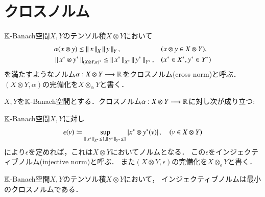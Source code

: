 \section{クロスノルム}
	\begin{screen}
		\begin{dfn}[クロスノルム]
			$\mathbb{K}$-Banach空間$X,Y$のテンソル積$X \otimes Y$において
			\begin{align}
				&\alpha(x \otimes y) \leq \left\|\, x\, \right\|_{X} \left\|\, y\, \right\|_{Y}, && (x \otimes y \in X \otimes Y), \\
				&\left\|\, x^* \otimes y^*\, \right\|_{(X \otimes Y, \alpha)^*} \leq \left\|\, x^*\, \right\|_{X^*} \left\|\, y^*\, \right\|_{Y^*},
				&& (x^* \in X^*, y^* \in Y^*)
			\end{align}
			を満たすようなノルム$\alpha:X \otimes Y \longrightarrow \mathbb{R}$をクロスノルム(cross norm)と呼ぶ．
			$(X \otimes Y, \alpha)$の完備化を$X \otimes_{\alpha} Y$と書く．
		\end{dfn}
	\end{screen}
	
	\begin{screen}
		\begin{thm}
			$X,Y$を$\mathbb{K}$-Banach空間とする．クロスノルム$\alpha:X \otimes Y \longrightarrow \mathbb{R}$に対し次が成り立つ:
		\end{thm}
	\end{screen}
	
	\begin{screen}
		\begin{dfn}[インジェクティブノルム]
			$\mathbb{K}$-Banach空間$X,Y$に対し
			\begin{align}
				\epsilon(v) \coloneqq
				\operatorname*{sup}_{\left\|\, x^*\, \right\|_{X^*}\leq 1,\left\|\, y^*\, \right\|_{Y^*} \leq 1} \left| x^* \otimes y^* (v) \right|,
				\quad (v \in X \otimes Y)
			\end{align}
			により$\epsilon$を定めれば，これは$X \otimes Y$においてノルムとなる．
			この$\epsilon$をインジェクティブノルム(injective norm)と呼ぶ．
			また$(X \otimes Y, \epsilon)$の完備化を$X \otimes_{\epsilon} Y$と書く．
		\end{dfn}
	\end{screen}
	
	\begin{screen}
		\begin{thm}[インジェクティブノルムは最小のクロスノルム]
			$\mathbb{K}$-Banach空間$X,Y$のテンソル積$X \otimes Y$において，
			インジェクティブノルムは最小のクロスノルムである．
		\end{thm}
	\end{screen}
	
